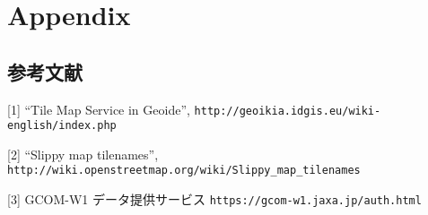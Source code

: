 \chapter*{Appendix}




\section*{参考文献}
         [1] ``Tile Map Service in Geoide'', \texttt{http://geoikia.idgis.eu/wiki-english/index.php}
       
       [2] ``Slippy map tilenames'', \texttt{http://wiki.openstreetmap.org/wiki/Slippy\_map\_tilenames}
       
[3] GCOM-W1 データ提供サービス \texttt{https://gcom-w1.jaxa.jp/auth.html}


